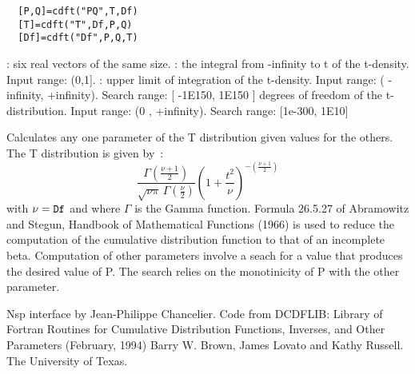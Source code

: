 \begin{mandesc}
\end{mandesc}
\label{cdft}
\begin{calling_sequence}
\begin{verbatim}
  [P,Q]=cdft("PQ",T,Df)  
  [T]=cdft("T",Df,P,Q)  
  [Df]=cdft("Df",P,Q,T)  
\end{verbatim}
\end{calling_sequence}
\begin{parameters}
  \begin{varlist}
    : six real vectors of the same size.
    : the integral from -infinity to t of the t-density. Input range: (0,1].
      : upper limit of integration of the t-density. Input range: ( -infinity, +infinity). Search range: [ -1E150, 1E150 ]
       degrees of freedom of the t-distribution. Input range: (0 , +infinity). Search range: [1e-300, 1E10]
  \end{varlist}
\end{parameters}
\begin{mandescription}
  Calculates any one parameter of the T distribution given
  values for the others. The T distribution is given by~:
  \begin{equation}
    \frac{\Gamma(\frac{\nu+1}{2})} {\sqrt{\nu\pi}\,\Gamma(\frac{\nu}{2})} \left(1+\frac{t^2}{\nu} \right)^{-(\frac{\nu+1}{2})} 
  \end{equation}
  with $\nu = \mbox{\tt Df}$  and where $\Gamma$ is the Gamma function.
  Formula  26.5.27  of   Abramowitz   and  Stegun,   Handbook   of
  Mathematical Functions  (1966) is used to reduce the computation
  of the cumulative distribution function to that of an incomplete
  beta.
  Computation of other parameters involve a seach for a value that
  produces  the desired  value  of P.   The search relies  on  the
  monotinicity of P with the other parameter.
\end{mandescription}

\begin{program}
\end{program}


\begin{authors}
  Nsp interface by Jean-Philippe Chancelier. Code from DCDFLIB: 
  Library of Fortran Routines for Cumulative Distribution
  Functions, Inverses, and Other Parameters (February, 1994)
  Barry W. Brown, James Lovato and Kathy Russell. The University of Texas.
\end{authors}
